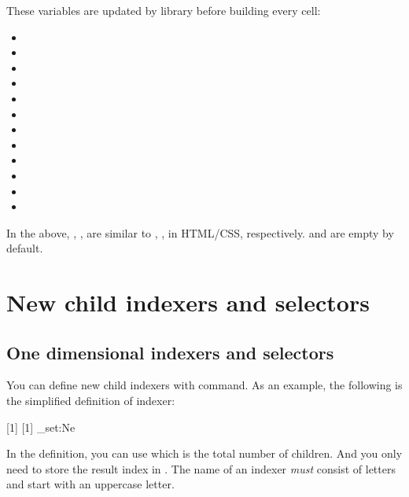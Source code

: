 \documentclass[oneside]{book}
\renewcommand\emph[1]{\textit{\color{red3}#1}}
\begin{document}
{These variables are updated by  library before building every cell:
\begin{itemize}[nosep]
  \item \CC{\lTblrCellAboveBorderStyleTl}
  \item \CC{\lTblrCellAboveBorderWidthDim}
  \item \CC{\lTblrCellAboveBorderColorTl}
  \item \CC{\lTblrCellBelowBorderStyleTl}
  \item \CC{\lTblrCellBelowBorderWidthDim}
  \item \CC{\lTblrCellBelowBorderColorTl}
  \item \CC{\lTblrCellLeftBorderStyleTl}
  \item \CC{\lTblrCellLeftBorderWidthDim}
  \item \CC{\lTblrCellLeftBorderColorTl}
  \item \CC{\lTblrCellRightBorderStyleTl}
  \item \CC{\lTblrCellRightBorderWidthDim}
  \item \CC{\lTblrCellRightBorderColorTl}
\end{itemize}
In the above, , ,  are similar to
, ,  in HTML/CSS, respectively.
 and  are empty by default.

\section{New child indexers and selectors}
\label{sect:newchild}

\subsection{One dimensional indexers and selectors}

You can define new child indexers with \CC{\NewTblrChildIndexer} command.
As an example, the following is the simplified definition of  indexer:
\begin{codehigh}[language=latex/latex3]
\ExplSyntaxOn
{} [1] [1]
  {
    \tl_set:Ne 
  }
\ExplSyntaxOff
\end{codehigh}
In the definition, you can use \CC{\lTblrChildTotalInt} which is the total number of children.
And you only need to store the result index  in \CC{\lTblrChildIndexTl}.
The name of an indexer \emph{must} consist of letters and start with an uppercase letter.

}
\end{document}

